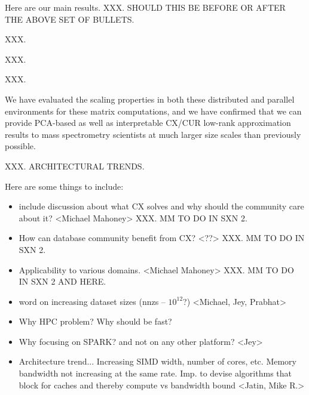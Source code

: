 Here are our main results.
XXX.  SHOULD THIS BE BEFORE OR AFTER THE ABOVE SET OF BULLETS.
\begin{compactitem}
\item
XXX.
\item
XXX.
\item
XXX.
\item
We have evaluated the scaling properties in both these distributed and parallel environments for these matrix computations, and we have confirmed that we can provide PCA-based as well as interpretable CX/CUR low-rank approximation results to mass spectrometry scientists at much larger size scales than previously possible.  
\end{compactitem}

XXX.  ARCHITECTURAL TRENDS.


Here are some things to include:
\begin{itemize}

\item include discussion about what CX solves and why should the community care about it? <Michael Mahoney>  XXX.  MM TO DO IN SXN 2.

\item How can database community benefit from CX? <??>  XXX.  MM TO DO IN SXN 2.

\item Applicability to various domains. <Michael Mahoney>  XXX.  MM TO DO IN SXN 2 AND HERE.

\item word on increasing dataset sizes (nnzs -- $10^{12}$?)  <Michael, Jey, Prabhat>

 \item Why HPC problem? Why should be fast?

\item Why focusing on SPARK? and not on any other platform? <Jey>

\item Architecture trend... Increasing SIMD width, number of cores, etc. Memory bandwidth not increasing at the same rate. Imp. to devise algorithms that block for caches and thereby compute vs bandwidth bound <Jatin, Mike R.>
    
\end{itemize}




